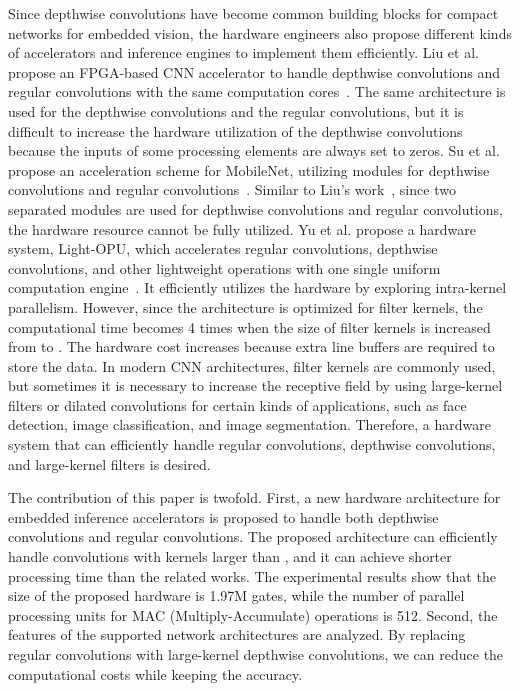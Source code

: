 \documentclass[runningheads]{llncs}
\begin{document}
Since depthwise convolutions have become common building blocks for compact networks for embedded vision, the hardware engineers also propose different kinds of accelerators and inference engines to implement them efficiently. Liu et al. propose an FPGA-based CNN accelerator to handle depthwise convolutions and regular convolutions with the same computation cores~\cite{Liu19}. The same architecture is used for the depthwise convolutions and the regular convolutions, but it is difficult to increase the hardware utilization of the depthwise convolutions because the inputs of some processing elements are always set to zeros. Su et al. propose an acceleration scheme for MobileNet, utilizing modules for depthwise convolutions and regular convolutions~\cite{Su18}. Similar to Liu's work~\cite{Liu19}, since two separated modules are used for depthwise convolutions and regular convolutions, the hardware resource cannot be fully utilized. Yu et al. propose a hardware system, Light-OPU, which accelerates regular convolutions, depthwise convolutions, and other lightweight operations with one single uniform computation engine~\cite{Yu20}. It efficiently utilizes the hardware by exploring intra-kernel parallelism. However, since the architecture is optimized for  filter kernels, the computational time becomes 4 times when the size of filter kernels is increased from  to . The hardware cost increases because extra line buffers are required to store the data. In modern CNN architectures,  filter kernels are commonly used, but sometimes it is necessary to increase the receptive field by using large-kernel filters \cite{Peng17} or dilated convolutions \cite{Wei18,Wu19} for certain kinds of applications, such as face detection, image classification, and image segmentation. Therefore, a hardware system that can efficiently handle regular convolutions, depthwise convolutions, and large-kernel filters is desired.

The contribution of this paper is twofold. First, a new hardware architecture for embedded inference accelerators is proposed to handle both depthwise convolutions and regular convolutions. The proposed architecture can efficiently handle convolutions with kernels larger than , and it can achieve shorter processing time than the related works. The experimental results show that the size of the proposed hardware is 1.97M gates, while the number of parallel processing units for MAC (Multiply-Accumulate) operations is 512. Second, the features of the supported network architectures are analyzed. By replacing regular convolutions with large-kernel depthwise convolutions, we can reduce the computational costs while keeping the accuracy.
\end{document}
